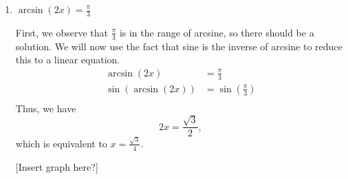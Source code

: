 \documentclass{ximera}
\begin{document}
\begin{example}
\begin{enumerate}
\begin{explanation}
Thus, we begin by simplifying $\sin\!\Big(\frac{5\pi}{4}\Big) = -\frac{\sqrt{2}}{2}$. 

Now, let's consider $\arcsin\!\Big(\!\!-\!\frac{\sqrt{2}}{2}\Big)$, recalling again the {\it range} of arcsine. We are looking for the value of $y$ in $\Big[\!-\frac{\pi}{2},\frac{\pi}{2}\Big]$ such that $\sin(y) =-\frac{\sqrt{2}}{2}$.

Hence, $y$ is $-\frac{\pi}{4}$, and we now see that 
\begin{equation*}
\arcsin\!\Big(\sin\!\Big(\frac{5\pi}{4}\Big)\Big) = \arcsin\!\Big(\!\!-\!\frac{\sqrt{2}}{2}\Big) = -\frac{\pi}{4}.
\end{equation*}

[graph for arcsine?]

\end{explanation}


\item $\arcsin(2x) = \frac{\pi}{3}$\\
\begin{explanation}
First, we observe that $\frac{\pi}{3}$ is in the range of arcsine, so there should be a solution. We will now use the fact that sine is the inverse of arcsine to reduce this to a linear equation.
\begin{align*}
\arcsin(2x) &= \frac{\pi}{3}\\
\sin(\arcsin(2x)) &= \sin(\frac{\pi}{3}) \\
\end{align*}
Thus, we have
$$2x = \frac{\sqrt{3}}{2},$$
which is equivalent to $x = \frac{\sqrt{3}}{4}$.

[Insert graph here?]
\end{explanation}
\end{enumerate}
\end{example}
\end{document}
